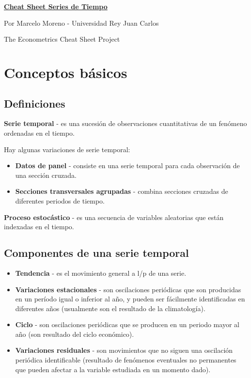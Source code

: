 \documentclass[10pt, a4paper, landscape]{extarticle}
\begin{document}
\setlength{\footskip}{12pt}

\begin{multicols}{3}

\begin{center}
	\textbf{\LARGE \href{https://github.com/marcelomijas/econometrics-cheatsheet}{Cheat Sheet Series de Tiempo}}

	{\footnotesize Por Marcelo Moreno - Universidad Rey Juan Carlos}

	{\footnotesize The Econometrics Cheat Sheet Project}
\end{center}

\section*{Conceptos básicos}

\subsection*{Definiciones}

\textbf{Serie temporal} -  es una sucesión de observaciones cuantitativas de un fenómeno ordenadas en el tiempo.

Hay algunas variaciones de serie temporal:

\begin{itemize}[leftmargin=*]
	\item \textbf{Datos de panel} - consiste en una serie temporal para cada observación de una sección cruzada.
	\item \textbf{Secciones transversales agrupadas} - combina secciones cruzadas de diferentes periodos de tiempo.
\end{itemize}

		\textbf{Proceso estocástico} - es una secuencia de variables aleatorias que están indexadas en el tiempo.

\subsection*{Componentes de una serie temporal}

\begin{itemize}[leftmargin=*]
	\item \textbf{Tendencia} - es el movimiento general a l/p de una serie.
	\item \textbf{Variaciones estacionales} - son oscilaciones periódicas que son producidas en un período igual o inferior al año, y pueden ser fácilmente identificadas en diferentes años (usualmente son el resultado de la climatología).
	\item \textbf{Ciclo} - son oscilaciones periódicas que se producen en un periodo mayor al año (son resultado del ciclo económico).
	\item \textbf{Variaciones residuales} - son movimientos que no siguen una oscilación periódica identificable (resultado de fenómenos eventuales no permanentes que pueden afectar a la variable estudiada en un momento dado).
\end{itemize}


\end{multicols}
\end{document}

